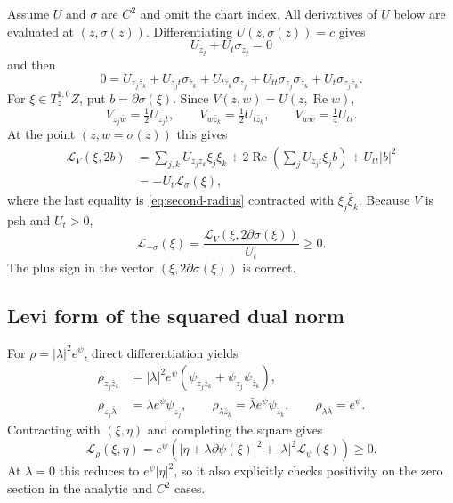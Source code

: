 \documentclass[11pt]{amsart}
\theoremstyle{definition}
\theoremstyle{remark}
\numberwithin{equation}{section}
\newcommand{\Levi}{\mathcal L}
\begin{document}
Assume $U$ and $\sigma$ are $C^2$ and omit the chart index. All
derivatives of $U$ below are evaluated at $(z,\sigma(z))$.
Differentiating $U(z,\sigma(z))=c$ gives
\[
U_{z_j}+U_t\sigma_{z_j}=0
\]
and then
\begin{equation}\label{eq:second-radius}
0=U_{z_j\bar z_k}+U_{z_jt}\sigma_{\bar z_k}
+U_{t\bar z_k}\sigma_{z_j}
+U_{tt}\sigma_{z_j}\sigma_{\bar z_k}
+U_t\sigma_{z_j\bar z_k}.
\end{equation}
For $\xi\in T_z^{1,0}Z$, put $b=\partial\sigma(\xi)$.
Since $V(z,w)=U(z,\operatorname{Re}w)$,
\[
V_{z_j\bar w}=\tfrac12U_{z_jt},\qquad
V_{w\bar z_k}=\tfrac12U_{t\bar z_k},\qquad
V_{w\bar w}=\tfrac14U_{tt}.
\]
At the point $(z,w=\sigma(z))$ this gives
\begin{align*}
\Levi_V(\xi,2b)
&=\sum_{j,k}U_{z_j\bar z_k}\xi_j\bar\xi_k
+2\operatorname{Re}\left(\sum_jU_{z_jt}\xi_j\bar b\right)
+U_{tt}|b|^2\\
&=-U_t\Levi_\sigma(\xi),
\end{align*}
where the last equality is \eqref{eq:second-radius} contracted with
$\xi_j\bar\xi_k$. Because $V$ is psh and $U_t>0$,
\begin{equation}\label{eq:Levi-radius}
\Levi_{-\sigma}(\xi)=\frac{\Levi_V(\xi,2\partial\sigma(\xi))}{U_t}
\ge0.
\end{equation}
The plus sign in the vector $(\xi,2\partial\sigma(\xi))$ is correct.

\subsection{Levi form of the squared dual norm}

For $\rho=|\lambda|^2e^\psi$, direct differentiation yields
\begin{align*}
\rho_{z_j\bar z_k}
&=|\lambda|^2e^\psi(\psi_{z_j\bar z_k}
+\psi_{z_j}\psi_{\bar z_k}),\\
\rho_{z_j\bar\lambda}&=\lambda e^\psi\psi_{z_j},\qquad
\rho_{\lambda\bar z_k}=\bar\lambda e^\psi\psi_{\bar z_k},\qquad
\rho_{\lambda\bar\lambda}=e^\psi.
\end{align*}
Contracting with $(\xi,\eta)$ and completing the square gives
\begin{equation}\label{eq:Levi-norm}
\Levi_\rho(\xi,\eta)
=e^\psi\left(
|\eta+\lambda\partial\psi(\xi)|^2
+|\lambda|^2\Levi_\psi(\xi)\right)\ge0.
\end{equation}
At $\lambda=0$ this reduces to $e^\psi|\eta|^2$, so it also explicitly
checks positivity on the zero section in the analytic and $C^2$ cases.
\end{document}
